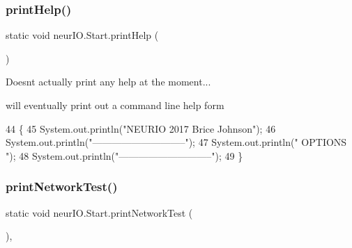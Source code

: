 \subsubsection{\texorpdfstring{print\+Help()}{printHelp()}}
{\footnotesize\ttfamily static void neur\+I\+O.\+Start.\+print\+Help (\begin{DoxyParamCaption}{ }\end{DoxyParamCaption})\hspace{0.3cm}{\ttfamily [static]}}

Doesn\textquotesingle{}t actually print any help at the moment...

will eventually print out a command line help form 
\begin{DoxyCode}
44                                   \{
45         System.out.println(\textcolor{stringliteral}{"NEURIO 2017 Brice Johnson"});
46         System.out.println(\textcolor{stringliteral}{"-----------------------------"});
47         System.out.println(\textcolor{stringliteral}{"           OPTIONS           "});
48         System.out.println(\textcolor{stringliteral}{"-----------------------------"});
49     \}
\end{DoxyCode}
\mbox{\label{classneur_i_o_1_1_start_ae0f93675889ad60b4c42b39a64e94910}} 
\subsubsection{\texorpdfstring{print\+Network\+Test()}{printNetworkTest()}}
{\footnotesize\ttfamily static void neur\+I\+O.\+Start.\+print\+Network\+Test (\begin{DoxyParamCaption}{ }\end{DoxyParamCaption})\hspace{0.3cm}{\ttfamily [static]}, {\ttfamily [private]}}

